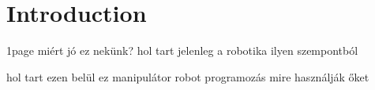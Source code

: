 \newpage

\thispagestyle{empty}

\chapter{Introduction}

1page miért jó ez nekünk?
hol tart jelenleg a robotika ilyen szempontból

hol tart ezen belül ez manipulátor robot programozás
mire használják őket